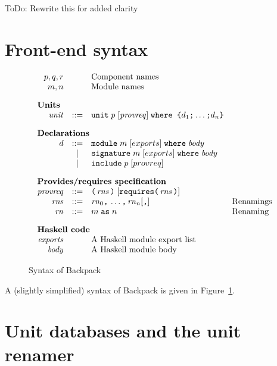 \documentclass{article}
\newcommand{\I}[1]{\ensuremath{\mathit{#1}}}
\newcommand{\Red}[1]{{\color{red} #1}}
\begin{document}
\Red{ToDo: Rewrite this for added clarity}

\newpage

\section{Front-end syntax}

\begin{figure}[htpb]
$$
\begin{array}{rcll}
p,q,r && \mbox{Component names} \\
m,n   && \mbox{Module names} \\[1em]
\multicolumn{3}{l}{\mbox{\bf Units}} \\
  \I{unit} & ::= & \verb|unit|\; p\; [\I{provreq}]\; \verb|where {| d_1 \verb|;| \ldots \verb|;| d_n \verb|}| \\[1em]
\multicolumn{3}{l}{\mbox{\bf Declarations}} \\
  d & ::= & \verb|module|\;    m \; [exports]\; \verb|where|\; \I{body} \\
    & |   & \verb|signature|\; m \; [exports]\; \verb|where|\; \I{body} \\
    & |   & \verb|include|\; p \; [provreq] \\[1em]
\multicolumn{3}{l}{\mbox{\bf Provides/requires specification}} \\
\I{provreq} & ::= & \verb|(| \, \I{rns} \, \verb|)| \; 
        [ \verb|requires(|\, \I{rns} \, \verb|)| ] \\
\I{rns} & ::= & \I{rn}_0 \verb|,| \, \ldots \verb|,| \, \I{rn}_n [\verb|,|] & \mbox{Renamings} \\
\I{rn} & ::= & m\; \verb|as| \; n & \mbox{Renaming} \\[1em] 
\multicolumn{3}{l}{\mbox{\bf Haskell code}} \\
\I{exports} & & \mbox{A Haskell module export list} \\
\I{body}    & & \mbox{A Haskell module body} \\
\end{array}
$$
\caption{Syntax of Backpack} \label{fig:syntax}
\end{figure}

A (slightly simplified) syntax of Backpack is given in Figure~\ref{fig:syntax}.

\newpage
\section{Unit databases and the unit renamer}
\end{document}
